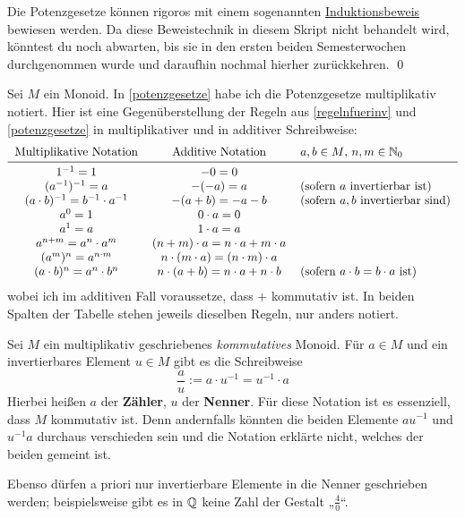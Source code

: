     
\begin{bew}
    Die Potenzgesetze können rigoros mit einem sogenannten \href{https://de.wikipedia.org/wiki/Vollst\%C3\%A4ndige_Induktion}{Induktionsbeweis} bewiesen werden. Da diese Beweistechnik in diesem Skript nicht behandelt wird, könntest du noch abwarten, bis sie in den ersten beiden Semesterwochen durchgenommen wurde und daraufhin nochmal hierher zurückkehren. \qed
\end{bew}


\begin{bem}[*]
    Sei $M$ ein Monoid. In \cref{potenzgesetze} habe ich die Potenzgesetze multiplikativ notiert. Hier ist eine Gegenüberstellung der Regeln aus \cref{regelnfuerinv} und \cref{potenzgesetze} in multiplikativer und in additiver Schreibweise:
    \[\begin{tabular}{ccl}
        Multiplikative Notation & Additive Notation & $a,b\in M$,\ $n,m\in \N_0$\\
        \midrule
        $1^{-1} = 1$ & $-0=0$ & \\
        $(a^{-1})^{-1} = a$ & $-(-a)=a$ & (sofern $a$ invertierbar ist) \\
        $(a\cdot b)^{-1} = b^{-1}\cdot a^{-1}$ & $-(a+b) = -a - b$ & (sofern $a,b$ invertierbar sind) \\
        $a^0 = 1$ & $0\cdot a = 0$ & \\
        $a^1 = a$ & $1\cdot a=a$ &\\
        $a^{n+m} = a^n\cdot a^m$ & $(n+m)\cdot a = n\cdot a + m\cdot a$ & \\
        $(a^m)^n = a^{n\cdot m}$ & $n\cdot (m\cdot a) = (n\cdot m)\cdot a$ & \\
        $(a\cdot b)^n =a^n\cdot b^n$ & $n\cdot (a+b) = n\cdot a+n\cdot b$ & (sofern $a\cdot b=b\cdot a$ ist)
    \end{tabular}\]
    wobei ich im additiven Fall voraussetze, dass $+$ kommutativ ist. In beiden Spalten der Tabelle stehen jeweils dieselben Regeln, nur anders notiert.
\end{bem}


\begin{nota}[* Bruchschreibweise]  
    Sei $M$ ein multiplikativ geschriebenes \emph{kommutatives} Monoid. Für $a\in M$ und ein invertierbares Element $u\in M$ gibt es die Schreibweise
        \[ \frac{a}{u} := a\cdot u^{-1} = u^{-1} \cdot a\]
    Hierbei heißen $a$ der \textbf{Zähler}, $u$ der \textbf{Nenner}. Für diese Notation ist es essenziell, dass $M$ kommutativ ist. Denn andernfalls könnten die beiden Elemente $au^{-1}$ und $u^{-1}a$ durchaus verschieden sein und die Notation erklärte nicht, welches der beiden gemeint ist.
    
    Ebenso dürfen a priori nur invertierbare Elemente in die Nenner geschrieben werden; beispielsweise gibt es in $\mathbb Q$ keine Zahl der Gestalt „$\frac{4}{0}$“.
\end{nota}


